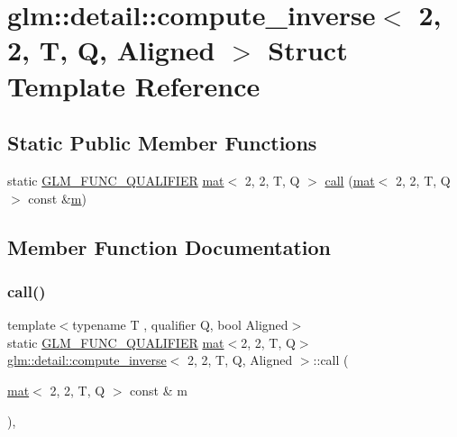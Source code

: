 \hypertarget{structglm_1_1detail_1_1compute__inverse_3_012_00_012_00_01_t_00_01_q_00_01_aligned_01_4}{}\section{glm\+:\+:detail\+:\+:compute\+\_\+inverse$<$ 2, 2, T, Q, Aligned $>$ Struct Template Reference}
\label{structglm_1_1detail_1_1compute__inverse_3_012_00_012_00_01_t_00_01_q_00_01_aligned_01_4}
\subsection*{Static Public Member Functions}
\begin{DoxyCompactItemize}
\item 
static \mbox{\hyperlink{setup_8hpp_a33fdea6f91c5f834105f7415e2a64407}{G\+L\+M\+\_\+\+F\+U\+N\+C\+\_\+\+Q\+U\+A\+L\+I\+F\+I\+ER}} \mbox{\hyperlink{structglm_1_1mat}{mat}}$<$ 2, 2, T, Q $>$ \mbox{\hyperlink{structglm_1_1detail_1_1compute__inverse_3_012_00_012_00_01_t_00_01_q_00_01_aligned_01_4_abc2ed8842638094e0aa6df0285997eb9}{call}} (\mbox{\hyperlink{structglm_1_1mat}{mat}}$<$ 2, 2, T, Q $>$ const \&\mbox{\hyperlink{_s_d_l__opengl__glext_8h_af593500c283bf1a787a6f947f503a5c2}{m}})
\end{DoxyCompactItemize}


\subsection{Member Function Documentation}
\mbox{\label{structglm_1_1detail_1_1compute__inverse_3_012_00_012_00_01_t_00_01_q_00_01_aligned_01_4_abc2ed8842638094e0aa6df0285997eb9}} 
\subsubsection{\texorpdfstring{call()}{call()}}
{\footnotesize\ttfamily template$<$typename T , qualifier Q, bool Aligned$>$ \\
static \mbox{\hyperlink{setup_8hpp_a33fdea6f91c5f834105f7415e2a64407}{G\+L\+M\+\_\+\+F\+U\+N\+C\+\_\+\+Q\+U\+A\+L\+I\+F\+I\+ER}} \mbox{\hyperlink{structglm_1_1mat}{mat}}$<$2, 2, T, Q$>$ \mbox{\hyperlink{structglm_1_1detail_1_1compute__inverse}{glm\+::detail\+::compute\+\_\+inverse}}$<$ 2, 2, T, Q, Aligned $>$\+::call (\begin{DoxyParamCaption}\item[{\mbox{\hyperlink{structglm_1_1mat}{mat}}$<$ 2, 2, T, Q $>$ const \&}]{m }\end{DoxyParamCaption})\hspace{0.3cm}{\ttfamily [inline]}, {\ttfamily [static]}}



